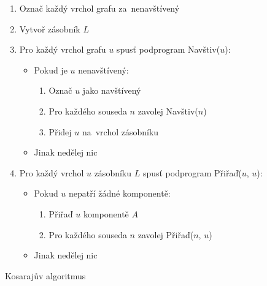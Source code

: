 \begin{figure}[htbp]
    \begin{minipage}{0.45\textwidth}
        \small
        \onehalfspacing
        \begin{enumerate}
            \item Označ každý vrchol grafu za~nenavštívený
            \item Vytvoř zásobník $L$
            \item Pro každý vrchol grafu $u$ spusť podprogram Navštiv($u$):
                  \begin{itemize}
                      \item Pokud je $u$ nenavštívený:
                            \begin{enumerate}
                                \item Označ $u$ jako navštívený
                                \item Pro každého souseda $n$ zavolej Navštiv($n$)
                                \item Přidej $u$ na~vrchol zásobníku
                            \end{enumerate}
                      \item Jinak nedělej nic
                  \end{itemize}
            \item Pro každý vrchol $u$ zásobníku $L$ spusť podprogram Přiřaď($u$, $u$):
                  \begin{itemize}
                      \item Pokud $u$ nepatří žádné komponentě:
                            \begin{enumerate}
                                \item Přiřaď $u$ komponentě $A$
                                \item Pro každého souseda $n$ zavolej Přiřaď($n$, $u$)
                            \end{enumerate}
                      \item Jinak nedělej nic
                  \end{itemize}
        \end{enumerate}
        \caption{Kosarajův algoritmus}
        \label{fig:kosaraj}
    \end{minipage}
    \hfill
    \begin{minipage}{0.45\textwidth}
        \small
        \onehalfspacing
        \begin{enumerate}

\end{enumerate}
\end{minipage}
\end{figure}
